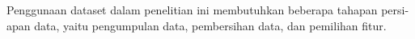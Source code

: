 Penggunaan dataset dalam penelitian ini membutuhkan beberapa tahapan persi-
apan data, yaitu pengumpulan data, pembersihan data, dan pemilihan fitur.